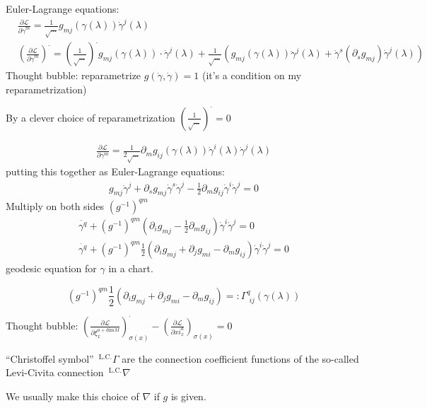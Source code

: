 Euler-Lagrange equations:
\[
\begin{aligned}
  & \frac{ \partial \mathcal{L}}{ \partial \dot{\gamma}^m } = \frac{1}{ \sqrt{  \dots } } g_{mj}(\gamma(\lambda)) \dot{\gamma}^j(\lambda) \\ 
  & \left( \frac{ \partial \mathcal{L}}{ \partial \dot{\gamma}^m } \right)^{\cdot} = \left( \frac{1}{ \sqrt{ \dots } } \right)^{\cdot} g_{mj}(\gamma(\lambda)) \cdot \dot{\gamma}^j(\lambda) + \frac{1}{\sqrt{ \dots }} \left( g_{mj}(\gamma(\lambda)) \ddot{\gamma}^j(\lambda) + \dot{\gamma}^s(\partial_s g_{mj}) \dot{\gamma}^j(\lambda) \right)
\end{aligned}
\]
Thought bubble: reparametrize $g(\dot{\gamma}, \dot{\gamma})=1$ (it's a condition on my reparametrization)

By a clever choice of reparametrization $( \frac{1}{\sqrt{ \dots }} )^{\cdot} =0$

\[
\begin{gathered}
  \frac{ \partial \mathcal{L}}{ \partial \gamma^m} = \frac{1}{ 2\sqrt{ \dots }} \partial_m g_{ij}(\gamma(\lambda)) \dot{\gamma}^i(\lambda) \dot{\gamma}^j(\lambda)
\end{gathered}
\]
putting this together as Euler-Lagrange equations:
\[
\begin{gathered}
g_{mj} \ddot{\gamma}^j +   \partial_s g_{mj} \dot{\gamma}^s \dot{\gamma}^j - \frac{1}{2} \partial_m g_{ij} \dot{\gamma}^i \dot{\gamma}^j = 0 
\end{gathered}
\]
Multiply on both sides $(g^{-1})^{qm}$
\[
\begin{gathered}
\ddot{\gamma^q} + (g^{-1})^{qm}(\partial_i g_{mj} - \frac{1}{2} \partial_m g_{ij} ) \dot{\gamma}^i \dot{\gamma}^j = 0  \\ 
\boxed{ \ddot{\gamma^q} + (g^{-1})^{qm}\frac{1}{2} (\partial_i g_{mj} + \partial_j g_{mi} -  \partial_m g_{ij} ) \dot{\gamma}^i \dot{\gamma}^j = 0 }
\end{gathered}
\]
geodesic equation for $\gamma$ in a chart.  

\[
\boxed{ (g^{-1})^{qm}\frac{1}{2} (\partial_i g_{mj} + \partial_j g_{mi} -  \partial_m g_{ij} ) =: \Gamma^q_{ \,\, ij}(\gamma(\lambda))
}
\]

Thought bubble: $\left( \frac{ \partial \mathcal{L}}{ \partial \xi_x^{a+\text{dim}M } } \right)^{\cdot}_{\sigma(x)} - \left( \frac{ \partial \mathcal{L}}{ \partial xi^a_x } \right)_{\sigma(x)} = 0$

\begin{definition}
``Christoffel symbol''   ${\,}^{\text{L.C.}}\Gamma$ are the connection coefficient functions of the so-called Levi-Civita connection ${\,}^{\text{L.C.}}\nabla$
\end{definition}
We usually make this choice of $\nabla$ if $g$ is given.  

